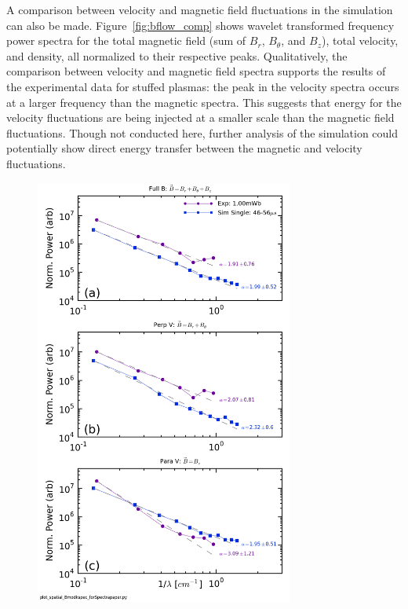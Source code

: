 \documentclass[aip,prl,amsmath,amssymb,reprint,superscriptaddress]{revtex4-1} %
\begin{document}
A comparison between velocity and magnetic field fluctuations in the simulation can also be made. Figure~\ref{fig:bflow_comp} shows wavelet transformed frequency power spectra for the total magnetic field (sum of $B_{r}$, $B_{\theta}$, and $B_{z}$), total velocity, and density, all normalized to their respective peaks. Qualitatively, the comparison between velocity and magnetic field spectra supports the results of the experimental data for stuffed plasmas: the peak in the velocity spectra occurs at a larger frequency than the magnetic spectra. This suggests that energy for the velocity fluctuations are being injected at a smaller scale than the magnetic field fluctuations. Though not conducted here, further analysis of the simulation could potentially show direct energy transfer between the magnetic and velocity fluctuations.

\begin{figure}[!htbp]
\centerline{
\includegraphics[width=8.5cm]{Bmod_FFTwavenumberspectra_wFits_40t60us_simulationcomparison}}
\caption{\label{fig:sim_wavenumber_comp}}
\end{figure}
\end{document}
